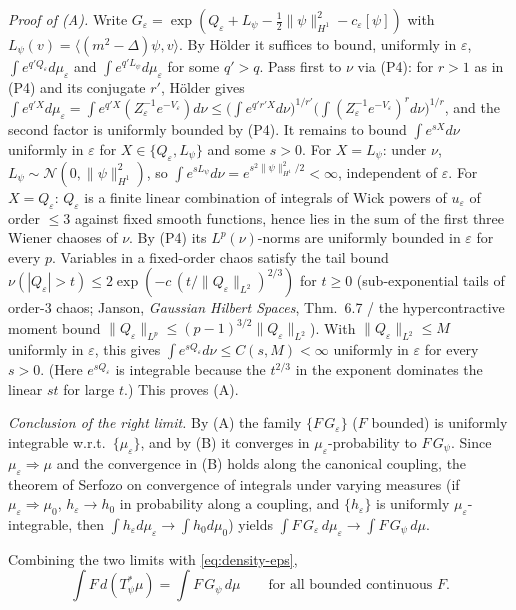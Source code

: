 \documentclass[12pt]{article}
\newcommand{\eps}{\varepsilon}
\theoremstyle{plain}
\theoremstyle{definition}
\begin{document}
\emph{Proof of (A).} Write $G_\eps=\exp(Q_\eps+L_\psi-\tfrac12\|\psi\|_{H^1}^2-c_\eps[\psi])$
with $L_\psi(v)=\langle(m^2-\Delta)\psi,v\rangle$. By H\"older it suffices to bound,
uniformly in $\eps$, $\int e^{q'Q_\eps}d\mu_\eps$ and $\int e^{q'L_\psi}d\mu_\eps$
for some $q'>q$. Pass first to $\nu$ via (P4): for $r>1$ as in (P4) and its
conjugate $r'$, H\"older gives
$\int e^{q'X}d\mu_\eps=\int e^{q'X}(Z_\eps^{-1}e^{-V_\eps})d\nu
\le\big(\int e^{q'r'X}d\nu\big)^{1/r'}\big(\int(Z_\eps^{-1}e^{-V_\eps})^{r}d\nu\big)^{1/r}$,
and the second factor is uniformly bounded by (P4). It remains to bound
$\int e^{sX}d\nu$ uniformly in $\eps$ for $X\in\{Q_\eps,L_\psi\}$ and some $s>0$.
For $X=L_\psi$: under $\nu$, $L_\psi\sim\mathcal N(0,\|\psi\|_{H^1}^2)$, so
$\int e^{sL_\psi}d\nu=e^{s^2\|\psi\|_{H^1}^2/2}<\infty$, independent of $\eps$.
For $X=Q_\eps$: $Q_\eps$ is a finite linear combination of integrals of Wick powers
of $u_\eps$ of order $\le3$ against fixed smooth functions, hence lies in the sum
of the first three Wiener chaoses of $\nu$. By (P4) its $L^p(\nu)$-norms are
uniformly bounded in $\eps$ for every $p$. Variables in a fixed-order chaos satisfy
the tail bound $\nu(|Q_\eps|>t)\le 2\exp(-c\,(t/\|Q_\eps\|_{L^2})^{2/3})$ for
$t\ge0$ (sub-exponential tails of order-$3$ chaos; Janson, \emph{Gaussian Hilbert
Spaces}, Thm.\ 6.7 / the hypercontractive moment bound
$\|Q_\eps\|_{L^p}\le(p-1)^{3/2}\|Q_\eps\|_{L^2}$). With $\|Q_\eps\|_{L^2}\le M$
uniformly in $\eps$, this gives $\int e^{sQ_\eps}d\nu\le C(s,M)<\infty$ uniformly in
$\eps$ for every $s>0$. (Here $e^{sQ_\eps}$ is integrable because the $t^{2/3}$ in
the exponent dominates the linear $st$ for large $t$.) This proves (A).

\emph{Conclusion of the right limit.} By (A) the family $\{F\,G_\eps\}$ ($F$ bounded)
is uniformly integrable w.r.t.\ $\{\mu_\eps\}$, and by (B) it converges in
$\mu_\eps$-probability to $F\,G_\psi$. Since $\mu_\eps\Rightarrow\mu$ and the
convergence in (B) holds along the canonical coupling, the theorem of Serfozo on
convergence of integrals under varying measures (if $\mu_\eps\Rightarrow\mu_0$,
$h_\eps\to h_0$ in probability along a coupling, and $\{h_\eps\}$ is uniformly
$\mu_\eps$-integrable, then $\int h_\eps d\mu_\eps\to\int h_0 d\mu_0$) yields
$\int F\,G_\eps\,d\mu_\eps\to\int F\,G_\psi\,d\mu$.

Combining the two limits with \eqref{eq:density-eps},
\begin{equation}\label{eq:final-id}
\int F\,d(T_\psi^*\mu)=\int F\,G_\psi\,d\mu\qquad\text{for all bounded continuous }F.
\end{equation}
\end{document}
